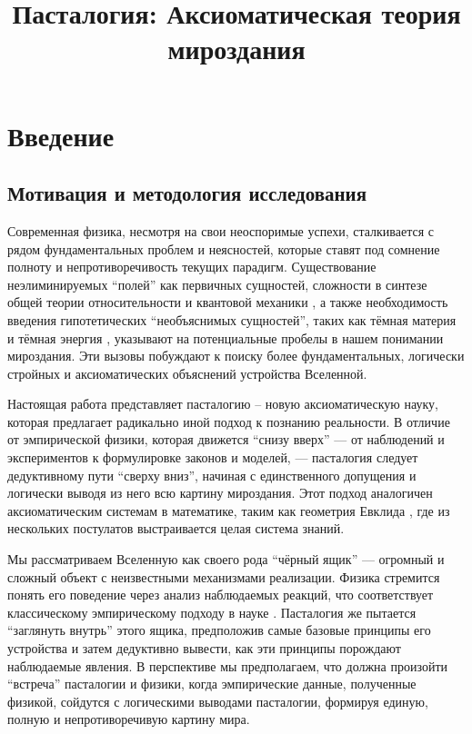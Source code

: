 \documentclass[pdflatex,sn-mathphys-num,referee]{sn-jnl}
\title[Пасталогия]{Пасталогия: Аксиоматическая теория мироздания}
\author*[1]{\fnm{Владимир} \sur{Ситников}}\email{montenegrofsm@google.com}
\affil*[1]{\orgdiv{Независимый исследователь}, \city{Бар}, \country{Черногория}}
\begin{document}
\maketitle

\section{Введение}\label{sec:introduction}

\subsection{Мотивация и методология исследования}\label{subsec:motivation-methodology}

Современная физика, несмотря на свои неоспоримые успехи, сталкивается с рядом фундаментальных проблем и неясностей, которые ставят под сомнение полноту и непротиворечивость текущих парадигм. Существование неэлиминируемых ``полей'' как первичных сущностей, сложности в синтезе общей теории относительности \cite{einstein1916} и квантовой механики \cite{bohr1928}, а также необходимость введения гипотетических ``необъяснимых сущностей'', таких как тёмная материя \cite{rubin1980} и тёмная энергия \cite{riess1998}, указывают на потенциальные пробелы в нашем понимании мироздания. Эти вызовы побуждают к поиску более фундаментальных, логически стройных и аксиоматических объяснений устройства Вселенной.

Настоящая работа представляет пасталогию – новую аксиоматическую науку, которая предлагает радикально иной подход к познанию реальности. В отличие от эмпирической физики, которая движется ``снизу вверх'' --- от наблюдений и экспериментов к формулировке законов и моделей, --- пасталогия следует дедуктивному пути ``сверху вниз'', начиная с единственного допущения и логически выводя из него всю картину мироздания. Этот подход аналогичен аксиоматическим системам в математике, таким как геометрия Евклида \cite{euclid-elements-heath}, где из нескольких постулатов выстраивается целая система знаний.

Мы рассматриваем Вселенную как своего рода ``чёрный ящик'' \cite{wiener1948} --- огромный и сложный объект с неизвестными механизмами реализации. Физика стремится понять его поведение через анализ наблюдаемых реакций, что соответствует классическому эмпирическому подходу в науке \cite{popper1959}. Пасталогия же пытается ``заглянуть внутрь'' этого ящика, предположив самые базовые принципы его устройства и затем дедуктивно вывести, как эти принципы порождают наблюдаемые явления. В перспективе мы предполагаем, что должна произойти ``встреча'' пасталогии и физики, когда эмпирические данные, полученные физикой, сойдутся с логическими выводами пасталогии, формируя единую, полную и непротиворечивую картину мира.
\end{document}
